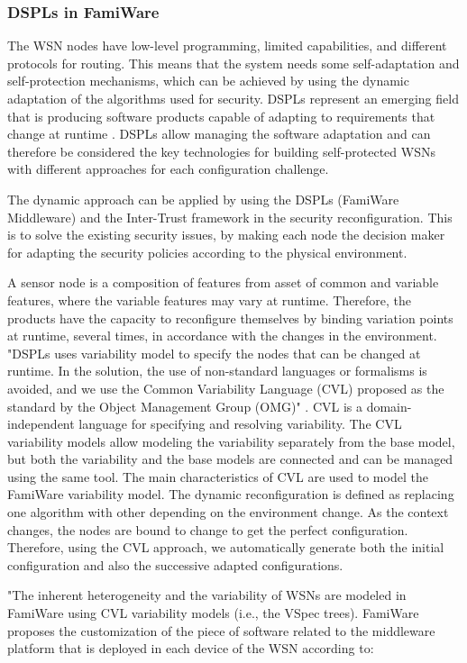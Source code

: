 \documentclass[12pt,a4paper,twoside]{report}
\begin{document}
\subsubsection{DSPLs in FamiWare}
The WSN nodes have low-level programming, limited capabilities, and different protocols for routing. This means that the system needs some self-adaptation and self-protection mechanisms, which can be achieved by using the dynamic adaptation of the algorithms used for security. DSPLs represent an emerging field that is producing software products capable of adapting to requirements that change at runtime \cite{Pinto;etal:2013}. DSPLs allow managing the software adaptation and can therefore be considered the key technologies for building self-protected WSNs with different approaches for each configuration challenge.\par
The dynamic approach can be applied by using the DSPLs (FamiWare Middleware) and the Inter-Trust framework in the security reconfiguration. This is to solve the existing security issues, by making each node the decision maker for adapting the security policies according to the physical environment.\par
A sensor node is a composition of features from asset of common and variable features, where the variable features may vary at runtime. Therefore, the products have the capacity to reconfigure themselves by binding variation points at runtime, several times, in accordance with the changes in the environment. "DSPLs uses variability model to specify the nodes that can be changed at runtime. In the solution, the use of non-standard languages or formalisms is avoided, and we use the Common Variability Language (CVL) proposed as the standard by the Object Management Group (OMG)" \cite{Pinto;etal:2013}. CVL is a domain-independent language for specifying and resolving variability. The CVL variability models allow modeling the variability separately from the base model, but both the variability and the base models are connected and can be managed using the same tool. The main characteristics of CVL are used to model the FamiWare variability model. The dynamic reconfiguration is defined as replacing one algorithm with other depending on the environment change. As the context changes, the nodes are bound to change to get the perfect configuration. Therefore, using the CVL approach, we automatically generate both the initial configuration and also the successive adapted configurations. \par
"The inherent heterogeneity and the variability of WSNs are modeled in FamiWare using CVL variability models (i.e., the VSpec trees). FamiWare proposes the customization of the piece of software related to the middleware platform that is deployed in each device of the WSN according to: \par
\end{document}
